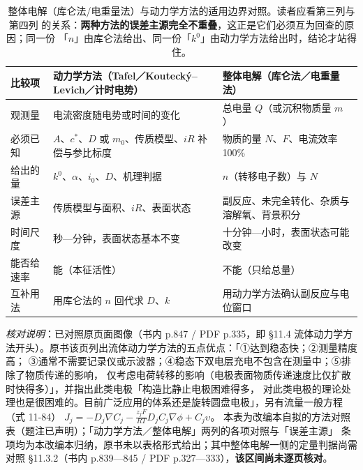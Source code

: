 \begin{table}[htbp]
\centering
\caption{整体电解（库仑法/电重量法）与动力学方法的适用边界对照。读者应看第三列与第四列
的关系：\textbf{两种方法的误差主源完全不重叠}，这正是它们必须互为回查的原因；同一份
「$n$」由库仑法给出、同一份「$k^{0}$」由动力学方法给出时，结论才站得住。}
\label{tab:bulk-vs-kinetics}
\begin{tabularx}{\columnwidth}{@{}p{20mm}Xp{47mm}@{}}
\toprule
比较项 & 动力学方法（Tafel／Koutecký--Levich／计时电势） & 整体电解（库仑法／电重量法） \\
\midrule
观测量 & 电流密度随电势或时间的变化 & 总电量 $Q$（或沉积物质量 $m$） \\
必须已知 & $A$、$c^{*}$、$D$ 或 $m_0$、传质模型、$iR$ 补偿与参比标度 & 物质的量 $N$、$F$、电流效率 100\% \\
给出的量 & $k^{0}$、$\alpha$、$i_0$、$D$、机理判据 & $n$（转移电子数）与 $N$ \\
误差主源 & 传质模型与面积、$iR$、表面状态 & 副反应、未完全转化、杂质与溶解氧、背景积分 \\
时间尺度 & 秒—分钟，表面状态基本不变 & 十分钟—小时，表面状态可能改变 \\
能否给速率 & 能（本征活性） & 不能（只给总量） \\
互补用法 & 用库仑法的 $n$ 回代求 $D$、$k$ & 用动力学方法确认副反应与电位窗口 \\
\bottomrule
\end{tabularx}

\end{table}

\emph{核对说明}：已对照原页面图像（书内 p.847 / PDF p.335，即 §11.4
流体动力学方法开头）。原书该页列出流体动力学方法的五点优点：「①达到稳态快；②测量精度高；
③通常不需要记录仪或示波器；④稳态下双电层充电不包含在测量中；⑤排除了物质传递的影响，
仅考虑电荷转移的影响（电极表面物质传递速度比仅扩散时快得多）」，并指出此类电极「构造比静止电极困难得多，
对此类电极的理论处理也是很困难的。目前广泛应用的体系还是旋转圆盘电极」，另有流量一般方程（式 11-84）
$J_j=-D_j\nabla
C_j-\frac{z_jF}{RT}D_jC_j\nabla\phi+C_j\upsilon$。
本表为改编本自拟的方法对照表（题注已声明）；「动力学方法／整体电解」两列的各项对照与「误差主源」
条项均为本改编本归纳，原书未以表格形式给出；其中整体电解一侧的定量判据尚需对照 §11.3.2（书内
p.839—845 / PDF p.327—333），\textbf{该区间尚未逐页核对}。


